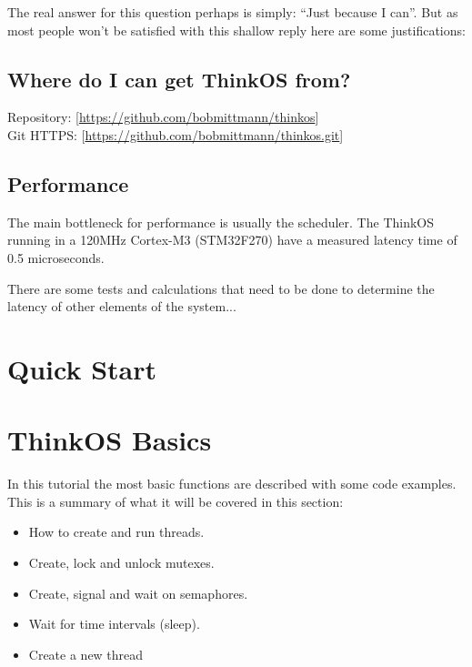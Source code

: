 The real answer for this question perhaps is simply: ``Just because I can''. But as most people won't be satisfied with this shallow reply here are some justifications:

\subsection{Where do I can get ThinkOS from?}

\begin{flushleft}
Repository: [\href{https://github.com/bobmittmann/thinkos}{https://github.com/bobmittmann/thinkos}]\\
Git HTTPS: [\href{https://github.com/bobmittmann/thinkos.git}{https://github.com/bobmittmann/thinkos.git}]
\end{flushleft}

\subsection{Performance}

The main bottleneck for performance is usually the scheduler. The ThinkOS running in a 120MHz Cortex-M3 (STM32F270) have a measured latency time of 0.5 microseconds.

There are some tests and calculations that need to be done to determine the latency of other elements of the system...

\section {Quick Start}

\section{ThinkOS Basics}

\lstset {language=C99}

In this tutorial the most basic \ThinkOS functions are described with some code examples. This is a summary of what it will be covered in this section:

\begin{itemize}
\item How to create and run threads.
\item Create, lock and unlock mutexes.
\item Create, signal and wait on semaphores.
\item Wait for time intervals (sleep).
\item Create a new thread
\end{itemize}

